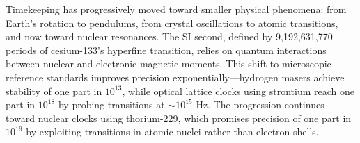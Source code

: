 Timekeeping has progressively moved toward smaller physical phenomena: from Earth's rotation to pendulums, from crystal oscillations to atomic transitions, and now toward nuclear resonances. The SI second, defined by 9,192,631,770 periods of cesium-133's hyperfine transition, relies on quantum interactions between nuclear and electronic magnetic moments. This shift to microscopic reference standards improves precision exponentially—hydrogen masers achieve stability of one part in $10^{13}$, while optical lattice clocks using strontium reach one part in $10^{18}$ by probing transitions at ${\sim}10^{15}$ Hz. The progression continues toward nuclear clocks using thorium-229, which promises precision of one part in $10^{19}$ by exploiting transitions in atomic nuclei rather than electron shells.
